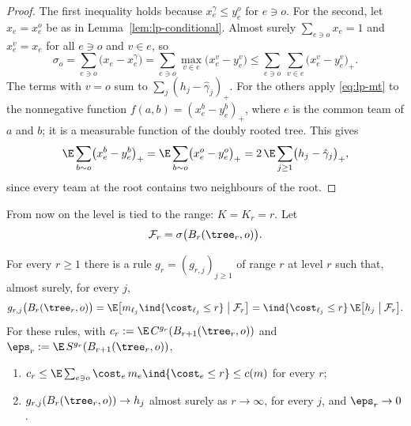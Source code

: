 \begin{proof}
The first inequality holds because $x^\gamma_e\le y^o_e$ for $e\ni o$. For the second, let
$x_e=x^o_e$ be as in Lemma~\ref{lem:lp-conditional}. Almost surely $\sum_{e\ni o}x_e=1$ and
$x^v_e=x_e$ for all $e\ni o$ and $v\in e$, so
\[
\sigma_o=\sum_{e\ni o}\bigl(x_e-x^\gamma_e\bigr)
=\sum_{e\ni o}\max_{v\in e}\bigl(x^v_e-y^v_e\bigr)
\le\sum_{e\ni o}\ \sum_{v\in e}\bigl(x^v_e-y^v_e\bigr)_+ .
\]
The terms with $v=o$ sum to $\sum_j(h_j-\hat\gamma_j)_+$. For the others apply
\eqref{eq:lp-mt} to the nonnegative function $f(a,b)=(x^b_e-y^b_e)_+$, where $e$ is the
common team of $a$ and $b$; it is a measurable function of the doubly rooted tree. This
gives
\[
\E\sum_{b\sim o}\bigl(x^b_e-y^b_e\bigr)_+=\E\sum_{b\sim o}\bigl(x^o_e-y^o_e\bigr)_+
=2\,\E\sum_{j\ge1}\bigl(h_j-\hat\gamma_j\bigr)_+ ,
\]
since every team at the root contains two neighbours of the root.
\end{proof}

From now on the level is tied to the range: $K=K_r=r$. Let
\[
\mathcal F_r=\sigma\bigl(B_r(\tree_r,o)\bigr).
\]

\begin{lemma}\label{lem:lp-condrule}
For every $r\ge1$ there is a rule $g_r=(g_{r,j})_{j\ge1}$ of range $r$ at level $r$ such
that, almost surely, for every $j$,
\begin{equation}\label{eq:lp-condrule}
g_{r,j}\bigl(B_r(\tree_r,o)\bigr)=\E\bigl[m_{\ell_j}\ind\{\cost_{\ell_j}\le r\}\bigm|
\mathcal F_r\bigr]=\ind\{\cost_{\ell_j}\le r\}\,\E\bigl[h_j\bigm|\mathcal F_r\bigr].
\end{equation}
For these rules, with $c_r:=\E\,C^{g_r}(B_{r+1}(\tree_r,o))$ and
$\eps_r:=\E\,S^{g_r}(B_{r+1}(\tree_r,o))$,
\begin{enumerate}
\item[\textup{(a)}] $c_r\le\E\sum_{e\ni o}\cost_e\,m_e\ind\{\cost_e\le r\}\le c(m)$ for
every $r$;
\item[\textup{(b)}] $g_{r,j}(B_r(\tree_r,o))\to h_j$ almost surely as $r\to\infty$, for
every $j$, and $\eps_r\to0$.
\end{enumerate}
\end{lemma}

